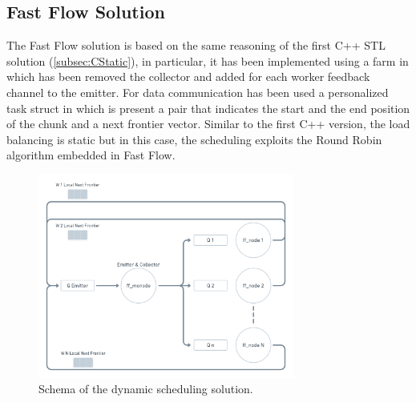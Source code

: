 \subsection{Fast Flow Solution}
The Fast Flow solution is based on the same reasoning of the first C++ STL solution (\ref{subsec:CStatic}), in particular, it has been implemented using a farm in which has been removed the collector and added for each worker feedback channel to the emitter. For data communication has been used a personalized task struct in which is present a pair that indicates the start and the end position of the chunk and a next frontier vector. Similar to the first C++ version,  the load balancing is static but in this case, the scheduling exploits the Round Robin algorithm embedded in Fast Flow.

\begin{figure}[htb!]
    \centering
    \includegraphics[width=0.75\textwidth]{Figures/FF.png}
    \caption{Schema of the dynamic scheduling solution.}
    \label{fig:FF}
\end{figure}
\FloatBarrier

